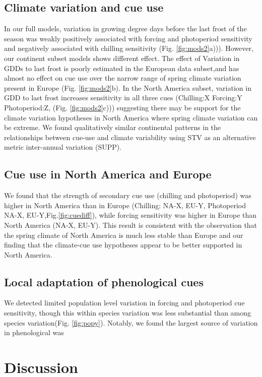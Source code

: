 \documentclass[12pt]{article}\usepackage[]{graphicx}\usepackage[]{color}
\begin{document}
\subsection*{Climate variation and cue use}
In our full models, variation in growing degree days before the last frost of the season was weakly positively associated with forcing and photoperiod sensitivity and negatively associated with chilling sensitivity (Fig. \ref{fig:mods2}a))). However, our continent subset models shows different effect. The effect of Variation in GDDs to last frost is poorly estimated in the European data subset,and has almost no effect on cue use over the narrow range of spring climate variation present in Europe  (Fig. \ref{fig:mods2}b). In the North America subset, variation in GDD to last frost increases sensitivity in all three cues (Chilling:X Forcing:Y Photoperiod:Z, (Fig. \ref{fig:mods2}c))) suggesting there may be support for the climate variation hypotheses in North America where spring climate variation can be extreme. We found qualitatively similar continental patterns in the relationships between cue-use and climate variability  using STV as an alternative metric inter-annual variation (SUPP).


\subsection{Cue use in North America and Europe}
We found that the strength of secondary cue use (chilling and photoperiod) was higher in North America than in Europe (Chilling: NA-X, EU-Y, Photoperiod NA-X, EU-Y,Fig.\ref{fig:cuediff}), while forcing sensitivity was higher in Europe than North America (NA-X, EU-Y). This result is consistent with the observation that the spring climate of North America is much less stable than Europe and our finding that the climate-cue use hypotheses appear to be better supported in North America.

\subsection*{Local adaptation of phenological cues}
We detected limited population level variation in forcing and photoperiod cue sensitivity, though this within species variation was less substantial than among species variation(Fig. \ref{fig:popy}). Notably, we found the largest source of variation in phenological was

\section*{Discussion}
\end{document}
